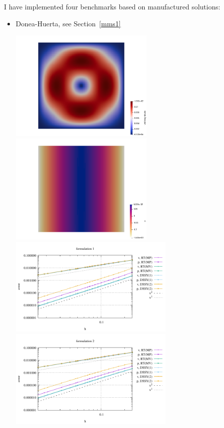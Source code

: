 I have implemented four benchmarks based on manufactured solutions:
\begin{itemize}
\item Donea-Huerta, see Section~\ref{mms1}

\begin{center}
\includegraphics[width=7cm]{python_codes/fieldstone_77/results/dh/vel}
\includegraphics[width=7cm]{python_codes/fieldstone_77/results/dh/press}\\
\includegraphics[width=8cm]{python_codes/fieldstone_77/results/dh/errors_form1}
\includegraphics[width=8cm]{python_codes/fieldstone_77/results/dh/errors_form2}\\

\end{center}
\end{itemize}
